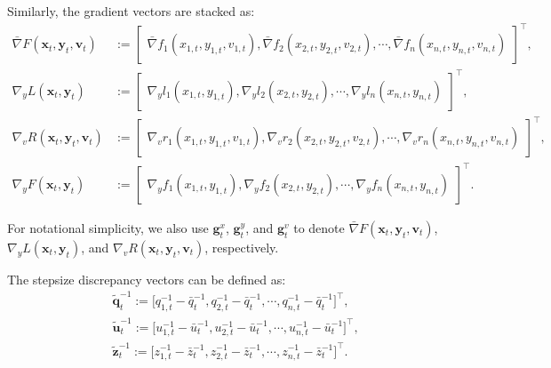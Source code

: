 \documentclass{article}
\theoremstyle{plain}
\theoremstyle{definition}
\theoremstyle{remark}
\begin{document}
Similarly, the gradient vectors are stacked as:
\begin{equation}
\begin{aligned}
    \!\bar{\nabla} {F}(\mathbf{x}_t, \mathbf{y}_t, \mathbf{v}_t) &:=
    \begin{bmatrix}
         \bar{\nabla}f_1(x_{1,t}, y_{1,t}, v_{1,t}),\bar{\nabla}f_2(x_{2,t}, y_{2,t}, v_{2,t}),\cdots, \bar{\nabla}f_n(x_{n,t}, y_{n,t}, v_{n,t})
    \end{bmatrix}^\top\!\!\!,\\
    \!\nabla_y {L}(\mathbf{x}_t, \mathbf{y}_t) &:=
    \begin{bmatrix}
        \nabla_yl_1(x_{1,t}, y_{1,t}),\nabla_yl_2(x_{2,t}, y_{2,t}),\cdots,  \nabla_yl_n(x_{n,t}, y_{n,t})
    \end{bmatrix}^\top\!\!\!,\\
    \!\nabla_v {R}(\mathbf{x}_t, \mathbf{y}_t, \mathbf{v}_t) &:=
    \begin{bmatrix}
        \nabla_v r_1(x_{1,t}, y_{1,t}, v_{1,t}),\nabla_v r_2(x_{2,t}, y_{2,t}, v_{2,t}),\cdots,\nabla_v r_n(x_{n,t}, y_{n,t}, v_{n,t})
    \end{bmatrix}^\top\!\!\!,\\
    \!{\nabla}_y {F}(\mathbf{x}_t, \mathbf{y}_t) &:=
    \begin{bmatrix}
         {\nabla}_yf_1(x_{1,t}, y_{1,t}),{\nabla}_yf_2(x_{2,t}, y_{2,t}),\cdots, {\nabla}_yf_n(x_{n,t}, y_{n,t})
    \end{bmatrix}^\top\!\!\!.
\end{aligned}
\end{equation}

For notational simplicity, we also use $\mathbf{g}_t^x$, $\mathbf{g}_t^y$, and $\mathbf{g}_t^v$ to denote $\bar{\nabla} F(\mathbf{x}_t, \mathbf{y}_t, \mathbf{v}_t)$, $\nabla_y L(\mathbf{x}_t, \mathbf{y}_t)$, and $\nabla_v R(\mathbf{x}_t, \mathbf{y}_t, \mathbf{v}_t)$, respectively.

The stepsize discrepancy vectors can be defined as:
\begin{equation}\label{eqquz}
\begin{aligned}
&\tilde{\mathbf{q}}_t^{-1} := \big[  q_{1,t}^{-1} - \bar{q}_t^{-1}, q_{2,t}^{-1} - \bar{q}_t^{-1},\cdots, q_{n,t}^{-1} - \bar{q}_t^{-1}\big]^\top,\\
&\tilde{\mathbf{u}}_t^{-1} := \big[u_{1,t}^{-1} - \bar{u}_t^{-1},u_{2,t}^{-1} - \bar{u}_t^{-1}, \cdots, u_{n,t}^{-1} - \bar{u}_t^{-1} \big]^\top,\\
&\tilde{\mathbf{z}}_t^{-1} := \big[ z_{1,t}^{-1} - \bar{z}_t^{-1},z_{2,t}^{-1} - \bar{z}_t^{-1},\cdots, z_{n,t}^{-1} - \bar{z}_t^{-1} \big]^\top.
\end{aligned}
\end{equation}
\end{document}

